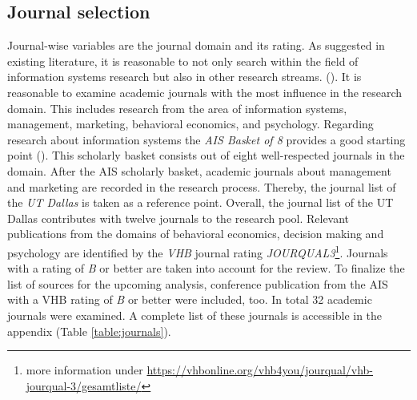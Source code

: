 \subsection{Journal selection}
Journal-wise variables are the journal domain and its rating. As suggested in existing literature, it is reasonable to not only search within the field of information systems research but also in other research streams. (\cite{webster_analyzing_2002}). It is reasonable to examine academic journals with the most influence in the research domain. This includes research from the area of information systems, management, marketing, behavioral economics, and psychology. Regarding research about information systems the \textit{AIS Basket of 8} provides a good starting point (\cite{alavi_review_1992}). This scholarly basket consists out of eight well-respected journals in the domain. After the AIS scholarly basket, academic journals about management and marketing are recorded in the research process. Thereby, the journal list of the \textit{UT Dallas} is taken as a reference point. Overall, the journal list of the UT Dallas contributes with twelve journals to the research pool. 
Relevant publications from the domains of behavioral economics, decision making and psychology are identified by the \textit{VHB} journal rating \textit{JOURQUAL3}\footnote{more information under \url{https://vhbonline.org/vhb4you/jourqual/vhb-jourqual-3/gesamtliste/}}. Journals with a rating of \textit{B} or better are taken into account for the review.
To finalize the list of sources for the upcoming analysis, conference publication from the AIS with a VHB rating of \textit{B} or better were included, too. In total 32 academic journals were examined. A complete list of these journals is accessible in the appendix (Table \ref{table:journals}).


